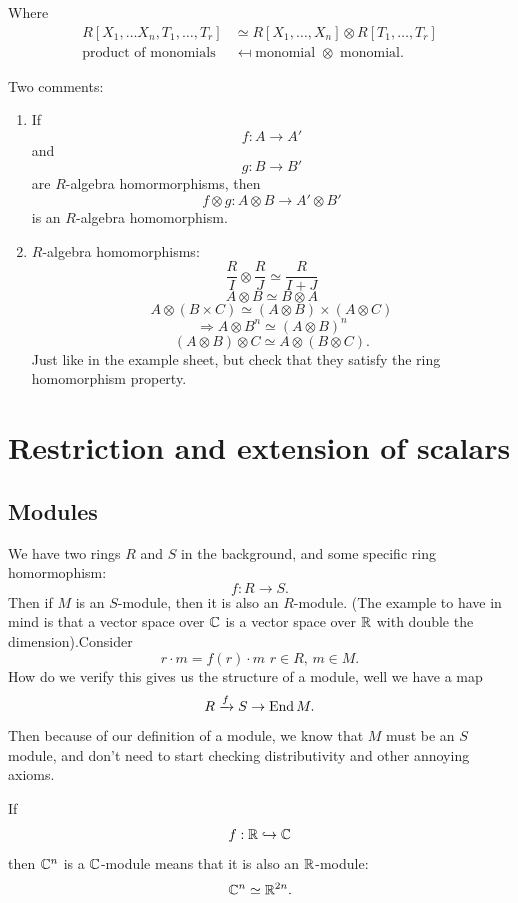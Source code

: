 \documentclass{article}
\begin{document}
Where \begin{align*}
    R[X_{1}, \dots X_{n}, T_{1}, \dots, T_{r}] &\simeq R[X_{1}, \dots, X_{n}] \otimes R[T_{1},\dots, T_{r}]\\
    \text{product of monomials} &\mapsfrom \text{monomial } \otimes \text{ monomial}.
\end{align*}







\newlec






Two comments:
\begin{enumerate}
    \item[(1)] If \[ f: A \to A'\] and \[ g: B \to B'\] are $R$-algebra homormorphisms, then \[ f \otimes g : A \otimes B \to A' \otimes B'\] is an $R$-algebra homomorphism.
    \item[(2)] $R$-algebra homomorphisms: \[ \frac{R}{I} \otimes \frac{R}{J} \simeq \frac{R}{I+J}\] \[ A \otimes B \simeq B \otimes A\] \[ A \otimes (B \times C) \simeq (A \otimes B) \times (A \otimes C)\] \[ \Rightarrow A \otimes B^{n} \simeq (A \otimes B)^{n}\] \[ (A \otimes B) \otimes C \simeq A \otimes (B \otimes C).\] Just like in the example sheet, but check that they satisfy the ring homomorphism property.
\end{enumerate}
\section{Restriction and extension of scalars}
\subsection{Modules}
We have two rings $R$ and $S$ in the background, and some specific ring homormophism: \[ f : R \to S.\] Then if $M$ is an $S$-module, then it is also an $R$-module. (The example to have in mind is that a vector space over $\mathbb{C}$ is a vector space over $\mathbb{R}$ with double the dimension).\gap Consider \[ r \cdot m = f(r) \cdot m \, \, r \in R,\, m \in M.\] How do we verify this gives us the structure of a module, well we have a map \[ R \xrightarrow f S \to \operatorname{End} M.\] Then because of our definition of a module, we know that $M$ must be an $S$ module, and don't need to start checking distributivity and other annoying axioms.
\begin{ex}
    If \[ f: \mathbb{R} \hookrightarrow \mathbb{C}\] then $\mathbb{C}^{n}$ is a $\mathbb{C}$-module means that it is also an $\mathbb{R}$-module: \[ \mathbb{C}^{n} \simeq \mathbb{R}^{2n}.\]
\end{ex}
\end{document}
